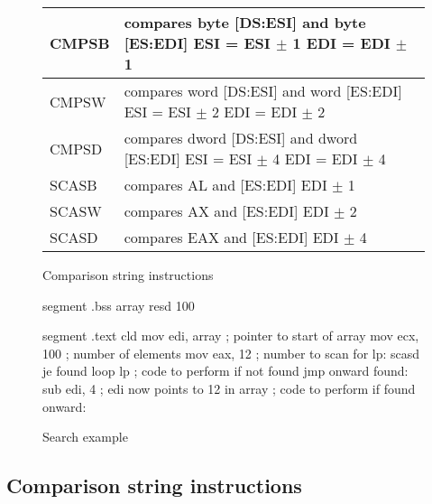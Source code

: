 \begin{figure}[t]
\centering
{\code
\begin{tabular}{|lp{3.5in}|}
\hline
CMPSB & compares byte [DS:ESI] and byte [ES:EDI] \newline ESI = ESI $\pm$ 1 
        \newline EDI = EDI $\pm$ 1 \\
\hline
CMPSW & compares word [DS:ESI] and word [ES:EDI] \newline ESI = ESI $\pm$ 2 
        \newline EDI = EDI $\pm$ 2 \\
\hline
CMPSD & compares dword [DS:ESI] and dword [ES:EDI] \newline ESI = ESI $\pm$ 4 
        \newline EDI = EDI $\pm$ 4 \\
\hline
SCASB & compares AL and [ES:EDI] \newline EDI $\pm$ 1 \\
\hline
SCASW & compares AX and [ES:EDI] \newline EDI $\pm$ 2 \\
\hline
SCASD & compares EAX and [ES:EDI] \newline EDI $\pm$ 4 \\
\hline
\end{tabular}
}
\caption{Comparison string instructions\label{fig:cmpString}
            
          }
\end{figure}

\begin{figure}[t]
\begin{AsmCodeListing}[frame=single,commandchars=\\\{\}]
segment .bss
array        resd 100

segment .text
      cld
      mov    edi, array    ; pointer to start of array
      mov    ecx, 100      ; number of elements
      mov    eax, 12       ; number to scan for
lp:
      scasd    \label{line:scasdSrchStrEx}
      je     found
      loop   lp
 ; code to perform if not found
      jmp    onward
found:
      sub    edi, 4         ; edi now points to 12 in array\label{line:subSrchStrEx}
 ; code to perform if found
onward:
\end{AsmCodeListing}
\caption{Search example\label{fig:srchStrEx}}
\end{figure}

\subsection{Comparison string instructions}

